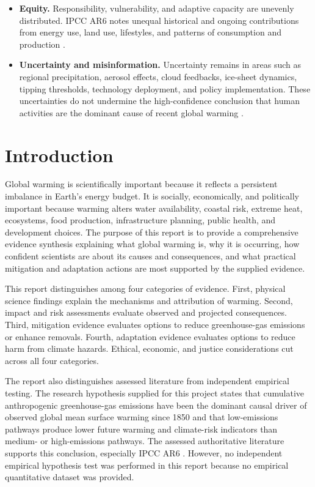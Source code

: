 \documentclass[12pt]{article}
\begin{document}
\begin{itemize}[leftmargin=1.5em]
    \item \textbf{Equity.} Responsibility, vulnerability, and adaptive capacity are unevenly distributed. IPCC AR6 notes unequal historical and ongoing contributions from energy use, land use, lifestyles, and patterns of consumption and production \cite{ref1}.
    \item \textbf{Uncertainty and misinformation.} Uncertainty remains in areas such as regional precipitation, aerosol effects, cloud feedbacks, ice-sheet dynamics, tipping thresholds, technology deployment, and policy implementation. These uncertainties do not undermine the high-confidence conclusion that human activities are the dominant cause of recent global warming \cite{ref1,ref5}.
\end{itemize}

\tableofcontents
\newpage

\section{Introduction}

Global warming is scientifically important because it reflects a persistent imbalance in Earth's energy budget. It is socially, economically, and politically important because warming alters water availability, coastal risk, extreme heat, ecosystems, food production, infrastructure planning, public health, and development choices. The purpose of this report is to provide a comprehensive evidence synthesis explaining what global warming is, why it is occurring, how confident scientists are about its causes and consequences, and what practical mitigation and adaptation actions are most supported by the supplied evidence.

This report distinguishes among four categories of evidence. First, physical science findings explain the mechanisms and attribution of warming. Second, impact and risk assessments evaluate observed and projected consequences. Third, mitigation evidence evaluates options to reduce greenhouse-gas emissions or enhance removals. Fourth, adaptation evidence evaluates options to reduce harm from climate hazards. Ethical, economic, and justice considerations cut across all four categories.

The report also distinguishes assessed literature from independent empirical testing. The research hypothesis supplied for this project states that cumulative anthropogenic greenhouse-gas emissions have been the dominant causal driver of observed global mean surface warming since 1850 and that low-emissions pathways produce lower future warming and climate-risk indicators than medium- or high-emissions pathways. The assessed authoritative literature supports this conclusion, especially IPCC AR6 \cite{ref1,ref6,ref7}. However, no independent empirical hypothesis test was performed in this report because no empirical quantitative dataset was provided.
\end{document}

